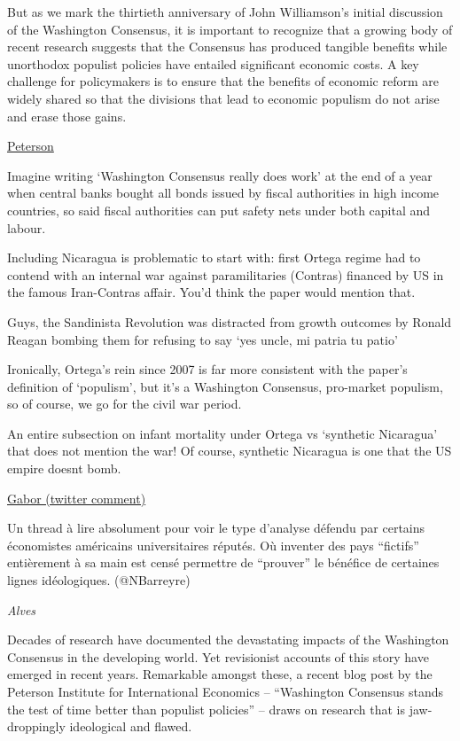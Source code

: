 \documentclass[
]{book}
\begin{document}
But as we mark the thirtieth anniversary of John Williamson's initial discussion of the Washington Consensus, it is important to recognize that a growing body of recent research suggests that the Consensus has produced tangible benefits while unorthodox populist policies have entailed significant economic costs. A key challenge for policymakers is to ensure that the benefits of economic reform are widely shared so that the divisions that lead to economic populism do not arise and erase those gains.

\href{https://www.piie.com/blogs/realtime-economic-issues-watch/washington-consensus-stands-test-time-better-populist-policies}{Peterson}

Imagine writing `Washington Consensus really does work' at the end of a year when central banks bought all bonds issued by fiscal authorities in high income countries, so said fiscal authorities can put safety nets under both capital and labour.

Including Nicaragua is problematic to start with:
first Ortega regime had to contend with an internal war against paramilitaries (Contras) financed by US in the famous Iran-Contras affair.
You'd think the paper would mention that.

Guys, the Sandinista Revolution was distracted from growth outcomes by Ronald Reagan bombing them for refusing to say `yes uncle, mi patria tu patio'

Ironically, Ortega's rein since 2007 is far more consistent with the paper's definition of `populism', but it's a Washington Consensus, pro-market populism, so of course, we go for the civil war period.

An entire subsection on infant mortality under Ortega vs `synthetic Nicaragua' that does not mention the war!
Of course, synthetic Nicaragua is one that the US empire doesnt bomb.

\href{https://twitter.com/DanielaGabor/status/1378959312110956544}{Gabor (twitter comment)}

Un thread à lire absolument pour voir le type d'analyse défendu par certains économistes américains universitaires réputés. Où inventer des pays ``fictifs'' entièrement à sa main est censé permettre de ``prouver'' le bénéfice de certaines lignes idéologiques.
(@NBarreyre)

\emph{Alves}

Decades of research have documented the devastating impacts of the Washington Consensus in the developing world. Yet revisionist accounts of this story have emerged in recent years. Remarkable amongst these, a recent blog post by the Peterson Institute for International Economics -- ``Washington Consensus stands the test of time better than populist policies'' -- draws on research that is jaw-droppingly ideological and flawed.
\end{document}
